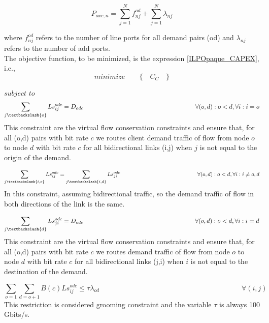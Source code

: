 \begin{equation}
P_{oxc,n} = \sum_{j=1}^{N} f_{nj}^{od} + \sum_{j=1}^{N} \lambda_{nj}
\label{OXC_poxc_transluc}
\end{equation}

\vspace{11pt}
\noindent
where $f_{nj}^{od}$ refers to the number of line ports for all demand pairs (od) and $\lambda_{nj}$ refers to the number of add ports.\\

The objective function, to be minimized, is the expression \ref{ILPOpaque_CAPEX}, i.e.,
\begin{equation*}
  minimize \qquad \Big\{ \quad C_C \quad \Big\}
\end{equation*}

$subject$ $to$
\begin{equation}
\sum_{j\textbackslash \{o\}} Ls_{ij}^{odc} = D_{odc}  \qquad \qquad \qquad \qquad \qquad \qquad \qquad \qquad \qquad
\forall(o,d) : o < d, \forall i: i = o
\label{ILPTransluc1}
\end{equation}
\noindent
This constraint are the virtual flow conservation constraints and ensure that, for all (o,d) pairs with bit rate $c$ we routes client demand traffic of flow from node $o$ to node $d$ with bit rate $c$ for all bidirectional links (i,j) when $j$ is not equal to the origin of the demand.

\begin{equation}
\sum_{j\textbackslash \{i,o\}} Ls_{ij}^{odc} = \sum_{j\textbackslash \{i,d\}} Ls_{ji}^{odc} \qquad \qquad \qquad \qquad \qquad \qquad \qquad
\forall(o,d) : o < d, \forall i: i \neq o,d
\label{ILPTransluc2}
\end{equation}
\noindent
In this constraint, assuming bidirectional traffic, so the demand traffic of flow in both directions of the link is the same.

\begin{equation}
\sum_{j\textbackslash \{d\}} Ls_{ji}^{odc} = D_{odc} \qquad \qquad \qquad \qquad \qquad \qquad \qquad \qquad \qquad
\forall(o,d) : o < d, \forall i: i = d
\label{ILPTransluc3}
\end{equation}
\noindent
This constraint are the virtual flow conservation constraints and ensure that, for all (o,d) pairs with bit rate $c$ we routes demand traffic of flow from node $o$ to node $d$ with bit rate $c$ for all bidirectional links (j,i) when $i$ is not equal to the destination of the demand.

\begin{equation}
\sum_{o=1} \sum_{d=o+1} B(c) Ls_{ij}^{odc} \leq  \tau \lambda_{od} \qquad \qquad \qquad \qquad \qquad \qquad \qquad \qquad \qquad \qquad
\forall (i,j)
\label{ILPTransluc4}
\end{equation}
\noindent
This restriction is considered grooming constraint and the variable $\tau$ is always 100 Gbits/s.

